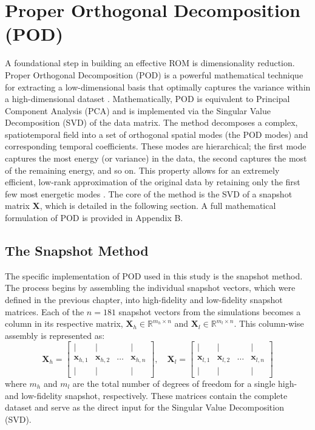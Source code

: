 \documentclass[tg, EN]{ufabcFHZh_tg}
\begin{document}
\section{Proper Orthogonal Decomposition (POD)}

A foundational step in building an effective ROM is dimensionality reduction. Proper Orthogonal Decomposition (POD) is a powerful mathematical technique for extracting a low-dimensional basis that optimally captures the variance within a high-dimensional dataset \citep{berkooz1993, sirovich1987, holmes2012}. Mathematically, POD is equivalent to Principal Component Analysis (PCA) and is implemented via the Singular Value Decomposition (SVD) of the data matrix. The method decomposes a complex, spatiotemporal field into a set of orthogonal spatial modes (the POD modes) and corresponding temporal coefficients. These modes are hierarchical; the first mode captures the most energy (or variance) in the data, the second captures the most of the remaining energy, and so on. This property allows for an extremely efficient, low-rank approximation of the original data by retaining only the first few most energetic modes \citep{rowley2017, taira2017}. The core of the method is the SVD of a snapshot matrix $\mathbf{X}$, which is detailed in the following section. A full mathematical formulation of POD is provided in Appendix B.

\subsection{The Snapshot Method}

The specific implementation of POD used in this study is the snapshot method. The process begins by assembling the individual snapshot vectors, which were defined in the previous chapter, into high-fidelity and low-fidelity snapshot matrices. Each of the $n=181$ snapshot vectors from the simulations becomes a column in its respective matrix, $\mathbf{X}_h \in \mathbb{R}^{m_h \times n}$ and $\mathbf{X}_l \in \mathbb{R}^{m_l \times n}$. This column-wise assembly is represented as:
\begin{equation}
    \mathbf{X}_h = 
    \begin{bmatrix}
        | & | & & | \\
        \mathbf{x}_{h,1} & \mathbf{x}_{h,2} & \dots & \mathbf{x}_{h,n} \\
        | & | & & |
    \end{bmatrix}
    , \quad
    \mathbf{X}_l = 
    \begin{bmatrix}
        | & | & & | \\
        \mathbf{x}_{l,1} & \mathbf{x}_{l,2} & \dots & \mathbf{x}_{l,n} \\
        | & | & & |
    \end{bmatrix}
    \label{eq:snapshot_matrix}
\end{equation}
where $m_h$ and $m_l$ are the total number of degrees of freedom for a single high- and low-fidelity snapshot, respectively. These matrices contain the complete dataset and serve as the direct input for the Singular Value Decomposition (SVD).
\end{document}
